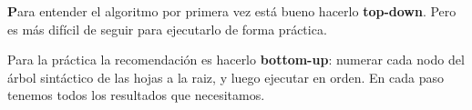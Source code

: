 \documentclass{report}
\theoremstyle{definition} %
\newenvironment{nota}[1]
    {\begin{leftbar}\textbf{#1}}
    {\end{leftbar}}
\begin{document}
\begin{figure}[H]
    \centering
\end{figure}

\begin{nota}
    Para entender el algoritmo por primera vez está bueno hacerlo
    \textbf{top-down}. Pero es más difícil de seguir para ejecutarlo de forma
    práctica.

    Para la práctica la recomendación es hacerlo \textbf{bottom-up}: numerar
    cada nodo del árbol sintáctico de las hojas a la raiz, y luego ejecutar en
    orden. En cada paso tenemos todos los resultados que necesitamos.
\end{nota}
\end{document}
